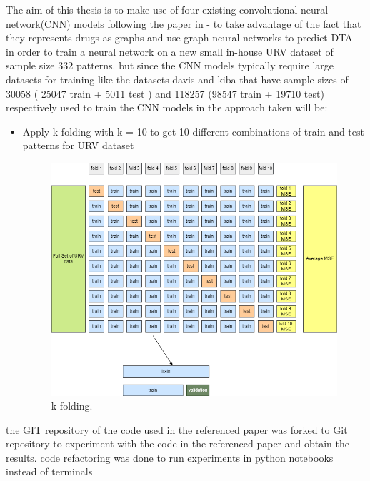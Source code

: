 \documentclass[11pt, a4paper]{article}
\begin{document}
The aim of this thesis is to make use of four existing convolutional neural network(CNN) models following the paper in \cite{1} - to take advantage of the fact that they represents drugs as graphs and use graph neural networks to predict DTA-
in order to train a neural network on a new small in-house URV dataset of sample size 332 patterns. but since the CNN models typically require large datasets for training like the datasets 
davis and kiba that have sample sizes of 30058 ( 25047 train + 5011 test ) and 118257 (98547 train + 19710 test) respectively used to train the CNN models in \cite{1} the approach taken will be:
\begin{itemize}
    \item Apply k-folding with k = 10 to get 10 different combinations of train and test patterns for URV dataset
    
    \begin{figure}[H]
        \centering
        \includegraphics[scale=0.4]{Kfold.png} %
        \caption{k-folding.}
        \label{fig 1}
    \end{figure}
            
\end{itemize} 

the GIT repository of the code \cite{2} used in the referenced paper \cite{1} was forked to Git repository \cite{3} to experiment with the 
code in the referenced paper and obtain the results. code refactoring was done to run experiments in python notebooks instead of terminals
\end{document}
